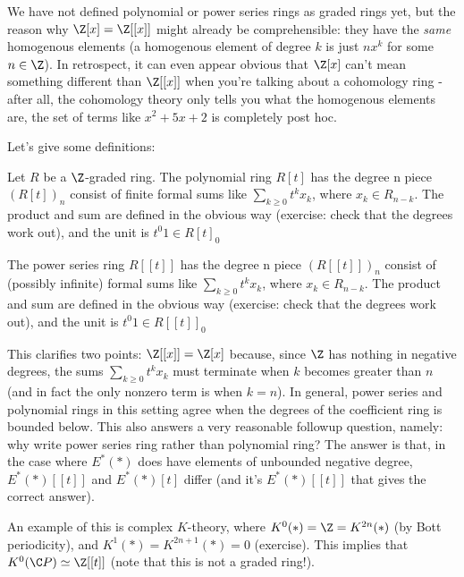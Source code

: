 We have not defined polynomial or power series rings as graded rings yet, but the reason why $\Z[x] = \Z[[x]]$ might already be comprehensible:
they have the \emph{same} homogenous elements (a homogenous element of degree $k$ is just $n x^k$ for some $n\in\Z$).
In retrospect, it can even appear obvious that $\Z[x]$ can't mean something different than $\Z[[x]]$ when you're talking about a cohomology ring - after all, the cohomology theory only tells you what the homogenous elements are, the set of terms like $x^2 + 5x + 2$ is completely post hoc.

Let's give some definitions:
\begin{definition}
  Let $R$ be a $\Z$-graded ring.
  The polynomial ring $R[t]$ has the degree n piece $(R[t])_n$ consist of finite formal sums like $\sum_{k\geq 0} t^k x_k$, where $x_k \in R_{n-k}$.
  The product and sum are defined in the obvious way (exercise: check that the degrees work out),
  and the unit is $t^0 1 \in R[t]_0$


  The power series ring $R[[t]]$ has the degree n piece $(R[[t]])_n$ consist of (possibly infinite) formal sums like $\sum_{k\geq 0} t^k x_k$, where $x_k \in R_{n-k}$.
  The product and sum are defined in the obvious way (exercise: check that the degrees work out),
  and the unit is $t^0 1 \in R[[t]]_0$
\end{definition}

This clarifies two points:
$\Z[[x]] = \Z[x]$ because, since $\Z$ has nothing in negative degrees, the sums $\sum_{k\geq 0} t^k x_k$ must terminate when $k$ becomes greater than $n$ (and in fact the only nonzero term is when $k = n$).
In general, power series and polynomial rings in this setting agree when the degrees of the coefficient ring is bounded below.
This also answers a very reasonable followup question, namely: why write power series ring rather than polynomial ring?
The answer is that, in the case where $E^*(\ast)$ does have elements of unbounded negative degree, $E^*(\ast)[[t]]$ and $E^*(\ast)[t]$
differ (and it's $E^*(\ast)[[t]]$ that gives the correct answer).

An example of this is complex $K$-theory, where $K^0(\ast) = \Z = K^{2n}(\ast)$ (by Bott periodicity), and $K^1(\ast) = K^{2n+1}(\ast) = 0$ (exercise).
This implies that $K^0(\C P) \simeq \Z[[t]]$ (note that this is not a graded ring!).
